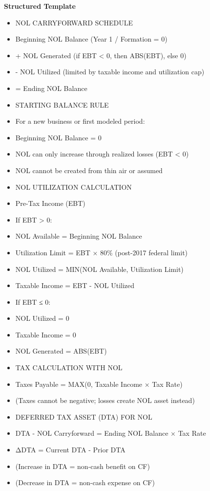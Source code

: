 \documentclass[11pt]{article}
\begin{document}
\textbf{Structured Template}
\begin{itemize}[leftmargin=*,itemsep=2pt,topsep=2pt]
\item {} NOL CARRYFORWARD SCHEDULE
\item {} Beginning NOL Balance (Year 1 / Formation = 0)
\item {} + NOL Generated (if EBT < 0, then ABS(EBT), else 0)
\item {} - NOL Utilized (limited by taxable income and utilization cap)
\item {} = Ending NOL Balance
\item {} STARTING BALANCE RULE
\item {} For a new business or first modeled period:
\item {} Beginning NOL Balance = 0
\item {} NOL can only increase through realized losses (EBT < 0)
\item {} NOL cannot be created from thin air or assumed
\item {} NOL UTILIZATION CALCULATION
\item {} Pre-Tax Income (EBT)
\item {} If EBT > 0:
\item {} NOL Available = Beginning NOL Balance
\item {} Utilization Limit = EBT × 80\% (post-2017 federal limit)
\item {} NOL Utilized = MIN(NOL Available, Utilization Limit)
\item {} Taxable Income = EBT - NOL Utilized
\item {} If EBT ≤ 0:
\item {} NOL Utilized = 0
\item {} Taxable Income = 0
\item {} NOL Generated = ABS(EBT)
\item {} TAX CALCULATION WITH NOL
\item {} Taxes Payable = MAX(0, Taxable Income × Tax Rate)
\item {} (Taxes cannot be negative; losses create NOL asset instead)
\item {} DEFERRED TAX ASSET (DTA) FOR NOL
\item {} DTA - NOL Carryforward = Ending NOL Balance × Tax Rate
\item {} ΔDTA = Current DTA - Prior DTA
\item {} (Increase in DTA = non-cash benefit on CF)
\item {} (Decrease in DTA = non-cash expense on CF)
\end{itemize}
\end{document}

